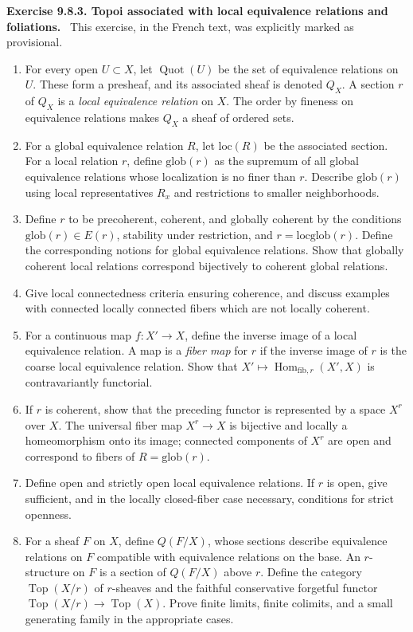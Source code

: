 \documentclass[11pt]{article}
\newcommand{\Top}{\operatorname{Top}}
\newcommand{\loc}{\mathrm{loc}}
\newcommand{\glob}{\mathrm{glob}}
\newcommand{\Quot}{\operatorname{Quot}}
\newenvironment{remarktext}[1]{\par\medskip\noindent\textbf{#1.}\ }{\par\medskip}
\begin{document}
\begin{remarktext}{Exercise 9.8.3. Topoi associated with local equivalence relations and foliations}
This exercise, in the French text, was explicitly marked as provisional.
\begin{enumerate}[label=\alph*)]
\item For every open \(U\subset X\), let \(\Quot(U)\) be the set of equivalence relations on \(U\). These form a presheaf, and its associated sheaf is denoted \(Q_X\). A section \(r\) of \(Q_X\) is a \emph{local equivalence relation} on \(X\). The order by fineness on equivalence relations makes \(Q_X\) a sheaf of ordered sets.
\item For a global equivalence relation \(R\), let \(\loc(R)\) be the associated section. For a local relation \(r\), define \(\glob(r)\) as the supremum of all global equivalence relations whose localization is no finer than \(r\). Describe \(\glob(r)\) using local representatives \(R_x\) and restrictions to smaller neighborhoods.
\item Define \(r\) to be precoherent, coherent, and globally coherent by the conditions \(\glob(r)\in E(r)\), stability under restriction, and \(r=\loc\glob(r)\). Define the corresponding notions for global equivalence relations. Show that globally coherent local relations correspond bijectively to coherent global relations.
\item Give local connectedness criteria ensuring coherence, and discuss examples with connected locally connected fibers which are not locally coherent.
\item For a continuous map \(f:X'\to X\), define the inverse image of a local equivalence relation. A map is a \emph{fiber map} for \(r\) if the inverse image of \(r\) is the coarse local equivalence relation. Show that \(X'\mapsto\operatorname{Hom}_{\mathrm{fib},r}(X',X)\) is contravariantly functorial.
\item If \(r\) is coherent, show that the preceding functor is represented by a space \(X^r\) over \(X\). The universal fiber map \(X^r\to X\) is bijective and locally a homeomorphism onto its image; connected components of \(X^r\) are open and correspond to fibers of \(R=\glob(r)\).
\item Define open and strictly open local equivalence relations. If \(r\) is open, give sufficient, and in the locally closed-fiber case necessary, conditions for strict openness.
\item For a sheaf \(F\) on \(X\), define \(Q(F/X)\), whose sections describe equivalence relations on \(F\) compatible with equivalence relations on the base. An \(r\)-structure on \(F\) is a section of \(Q(F/X)\) above \(r\). Define the category \(\Top(X/r)\) of \(r\)-sheaves and the faithful conservative forgetful functor \(\Top(X/r)\to\Top(X)\). Prove finite limits, finite colimits, and a small generating family in the appropriate cases.

\end{enumerate}
\end{remarktext}
\end{document}
